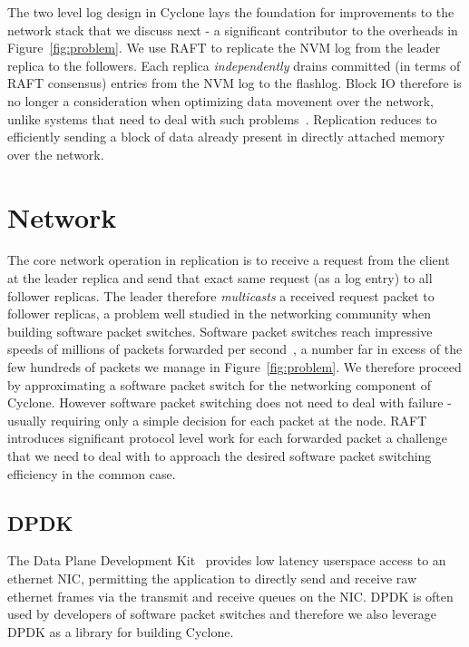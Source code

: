 \documentclass[pageno]{jpaper}
\begin{document}
The two level log design in Cyclone lays the foundation for improvements to the
network stack that we discuss next - a significant contributor to the overheads
in Figure~\ref{fig:problem}. We use RAFT to replicate the NVM log from the
leader replica to the followers. Each replica \emph{independently} drains
committed (in terms of RAFT consensus) entries from the NVM log to the
flashlog. Block IO therefore is no longer a consideration when optimizing data
movement over the network, unlike systems that need to deal with such
problems~\cite{reflex}. Replication reduces to efficiently sending a block of
data already present in directly attached memory over the network. 

\section{Network}
\label{sec:network}

The core network operation in replication is to receive a request from the
client at the leader replica and send that exact same request (as a log entry)
to all follower replicas. The leader therefore \emph{multicasts} a received
request packet to follower replicas, a problem well studied in the networking
community when building software packet switches. Software packet switches reach
impressive speeds of millions of packets forwarded per second~\cite{dpdk_perf}, a
number far in excess of the few hundreds of packets we manage in
Figure~\ref{fig:problem}. We therefore proceed by approximating a software
packet switch for the networking component of Cyclone. However software packet
switching does not need to deal with failure - usually requiring only a simple
decision for each packet at the node. RAFT introduces significant
protocol level work for each forwarded packet a challenge that we need to deal
with to approach the desired software packet switching efficiency in the common
case.

\subsection{DPDK}
The Data Plane Development Kit~\cite{dpdk} provides low latency userspace access
to an ethernet NIC, permitting the application to directly send and receive raw
ethernet frames via the transmit and receive queues on the NIC. DPDK is often
used by developers of software packet switches and therefore we also leverage
DPDK as a library for building Cyclone.
\end{document}
